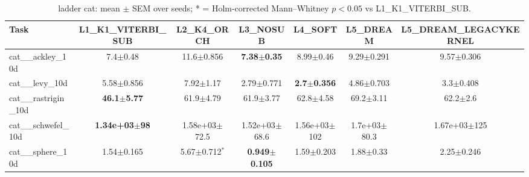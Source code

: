 \begin{table}[t]
\caption{ladder cat: mean $\pm$ SEM over seeds; * = Holm-corrected Mann--Whitney $p<0.05$ vs L1_K1_VITERBI_SUB.}
\label{tab:ladder_cat}
\begin{center}\small
\begin{tabular}{lcccccc}
\hline
Task & L1\_K1\_VITERBI\_SUB & L2\_K4\_ORCH & L3\_NOSUB & L4\_SOFT & L5\_DREAM & L5\_DREAM\_LEGACYKERNEL \\
\hline
cat\_\_ackley\_10d & 7.4$\pm$0.48 & 11.6$\pm$0.856 & \textbf{7.38$\pm$0.35} & 8.99$\pm$0.46 & 9.29$\pm$0.291 & 9.57$\pm$0.306 \\
cat\_\_levy\_10d & 5.58$\pm$0.856 & 7.92$\pm$1.17 & 2.79$\pm$0.771 & \textbf{2.7$\pm$0.356} & 4.86$\pm$0.703 & 3.3$\pm$0.408 \\
cat\_\_rastrigin\_10d & \textbf{46.1$\pm$5.77} & 61.9$\pm$4.79 & 61.9$\pm$3.77 & 62.8$\pm$4.58 & 69.2$\pm$3.11 & 62.2$\pm$2.6 \\
cat\_\_schwefel\_10d & \textbf{1.34e+03$\pm$98} & 1.58e+03$\pm$72.5 & 1.52e+03$\pm$68.6 & 1.56e+03$\pm$102 & 1.7e+03$\pm$80.3 & 1.67e+03$\pm$125 \\
cat\_\_sphere\_10d & 1.54$\pm$0.165 & 5.67$\pm$0.712$^{*}$ & \textbf{0.949$\pm$0.105} & 1.59$\pm$0.203 & 1.88$\pm$0.33 & 2.25$\pm$0.246 \\
\hline
\end{tabular}
\end{center}
\end{table}
